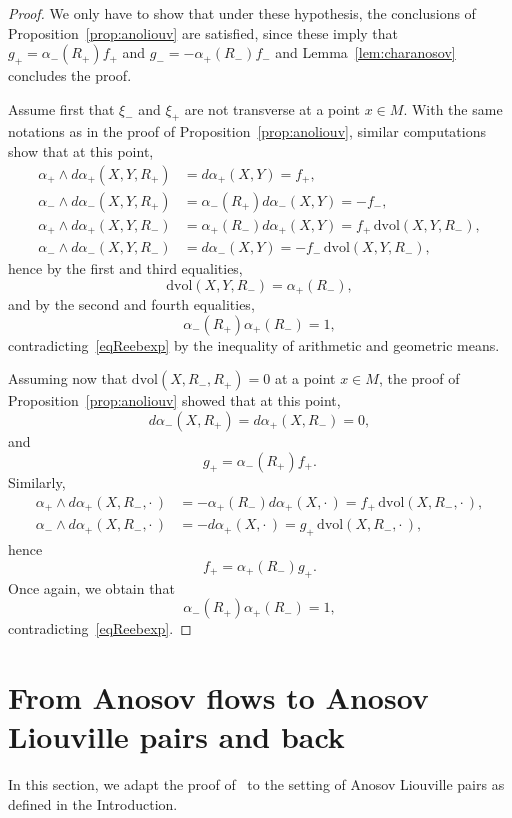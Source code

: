 \documentclass[letterpaper, 11pt]{article}
\numberwithin{equation}{section}
\begin{document}
\begin{proof}
We only have to show that under these hypothesis, the conclusions of Proposition~\ref{prop:anoliouv} are satisfied, since these imply that $g_+ = \alpha_-(R_+) f_+$ and $g_- = - \alpha_+(R_-) f_-$ and Lemma~\ref{lem:charanosov} concludes the proof.

Assume first that $\xi_-$ and $\xi_+$ are not transverse at a point $x\in M$. With the same notations as in the proof of Proposition~\ref{prop:anoliouv}, similar computations show that at this point, 
\begin{align*}
\alpha_+ \wedge d\alpha_+ (X,Y,R_+) &= d\alpha_+(X,Y) = f_+, \\
\alpha_- \wedge d\alpha_- (X,Y,R_+) &= \alpha_-(R_+) d\alpha_-(X,Y) = -f_-,\\
\alpha_+ \wedge d\alpha_+(X,Y,R_-) &= \alpha_+(R_-) d\alpha_+(X,Y) = f_+ \, \mathrm{dvol}(X,Y,R_-), \\
\alpha_- \wedge d\alpha_-(X,Y,R_-) &= d\alpha_-(X,Y) = -f_- \, \mathrm{dvol}(X,Y,R_-),
\end{align*}
hence by the first and third equalities,
$$\mathrm{dvol}(X,Y,R_-) = \alpha_+(R_-),$$ 
and by the second and fourth equalities,
$$\alpha_-(R_+) \alpha_+(R_-) = 1,$$
contradicting~\eqref{eqReebexp} by the inequality of arithmetic and geometric means.

Assuming now that $\mathrm{dvol}(X,R_-, R_+)=0$ at a point $x \in M$, the proof of Proposition~\ref{prop:anoliouv} showed that at this point, $$d\alpha_-(X,R_+) = d\alpha_+(X, R_-) = 0,$$
and $$g_+ =\alpha_-(R_+) f_+.$$
Similarly,
\begin{align*}
\alpha_+ \wedge d\alpha_+ (X,R_-,\cdot\, ) &= -\alpha_+(R_-) d\alpha_+(X,\cdot\, ) = f_+\, \mathrm{dvol}(X,R_-, \cdot\, ), \\
\alpha_- \wedge d\alpha_+ (X,R_-, \cdot\, ) &= - d\alpha_+(X, \cdot\, ) = g_+\,  \mathrm{dvol}(X, R_-, \cdot\, ),
\end{align*}
hence $$f_+ = \alpha_+(R_-) g_+.$$
Once again, we obtain that $$\alpha_-(R_+) \alpha_+(R_-) = 1,$$ contradicting~\eqref{eqReebexp}.
\end{proof}

    \section{From Anosov flows to Anosov Liouville pairs and back}
    
    In this section, we adapt the proof of~\cite[Theorem 1.1]{H22a} to the setting of Anosov Liouville pairs as defined in the Introduction.
    
\end{document}
